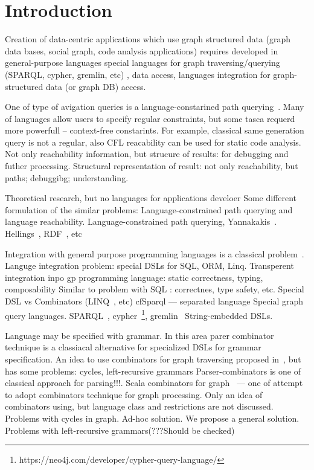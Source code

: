 \section{Introduction}

Creation of data-centric applications which use graph structured data (graph data bases, social graph, code analysis applications) requires 
developed in general-purpose languages 
special languages for graph traversing/querying (SPARQL, cypher, gremlin, etc)
, data access, languages integration for graph-structured data (or graph DB) access.

One of type of avigation queries is a language-constarined path querying~\cite{!!!}.
Many of languages allow users to specify regular constraints, but some tasca requerd more powerfull -- context-free constarints.
For example, classical same generation query is not a regular, also CFL reacability can be used for static code analysis.
Not only reachability information, but strucure of results: for debugging and futher processing.
Structural representation of result: not only reachability, but paths; debuggibg; understanding.

Theoretical research, but no languages for applications develoer
Some different formulation of the similar problems: Language-constrained path querying and language reachability.
Language-constrained path querying, Yannakakis~\cite{Yannakakis}. 
Hellings~\cite{ConjCFPathQuery, Hellings16}, RDF~\cite{CFGonRDF}, etc~\cite{QueryGraphWithData, RegularDBQuery, GraphQueryWithEarley, FLCpathProblem, graphDB}


Integration with general purpose programming languages is a classical problem~\cite{stringEmbeddedLanguagesProblem}.
Languge integration problem: special DSLs for SQL, ORM, Linq.
Transperent integration inpo gp programming language: static correctness, typing, composability
Similar to problem with SQL : correctnes, type safety, etc. Special DSL vs Combinators (LINQ~\cite{LINQ1, LINQ2}, etc)
cfSparql --- separated language
Special graph query languages. SPARQL~\cite{sparql}, cypher~\footnote{https://neo4j.com/developer/cypher-query-language/}, gremlin~\cite{gremlin}
String-embedded DSLs.


Language may be specified with grammar.
In this area parer combinator technique is a classiacal alternative for specialized DSLs for grammar specification. 
An idea to use combinators for graph traversing proposed in~\cite{ScalaGraphParsing}, but has some problems: cycles, left-recursive grammars
Parser-combinators is one of classical approach for parsing!!!.
Scala combinators for graph~\cite{ScalaGraphParsing} --- one of attempt to adopt combinators technique for graph processing.
Only an idea of combinators using, but language class and restrictions are not discussed.
Problems with cycles in graph. 
Ad-hoc solution.
We propose a general solution.
Problems with left-recursive grammars(???Should be checked)


